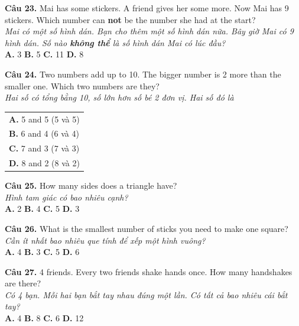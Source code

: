 \documentclass[11pt,a4paper]{article}
\begin{document}
\textbf{Câu 23.} Mai has some stickers. A friend gives her some more. Now Mai has 9 stickers. Which number can \textbf{not} be the number she had at the start?\\
\textit{Mai có một số hình dán. Bạn cho thêm một số hình dán nữa. Bây giờ Mai có 9 hình dán. Số nào \textbf{không thể} là số hình dán Mai có lúc đầu?}\\
\textbf{A.} 3 \quad \textbf{B.} 5 \quad \textbf{C.} 11 \quad \textbf{D.} 8\par\vspace{1.2mm}

\textbf{Câu 24.} Two numbers add up to 10. The bigger number is 2 more than the smaller one. Which two numbers are they?\\
\textit{Hai số có tổng bằng 10, số lớn hơn số bé 2 đơn vị. Hai số đó là}\\
\begin{tabular}{@{}l@{}}
\textbf{A.} 5 and 5 (5 và 5)\\
\textbf{B.} 6 and 4 (6 và 4)\\
\textbf{C.} 7 and 3 (7 và 3)\\
\textbf{D.} 8 and 2 (8 và 2)
\end{tabular}\par\vspace{1.2mm}

\textbf{Câu 25.} How many sides does a triangle have?\\
\textit{Hình tam giác có bao nhiêu cạnh?}\\
\textbf{A.} 2 \quad \textbf{B.} 4 \quad \textbf{C.} 5 \quad \textbf{D.} 3\par\vspace{1.2mm}

\textbf{Câu 26.} What is the smallest number of sticks you need to make one square?\\
\textit{Cần ít nhất bao nhiêu que tính để xếp một hình vuông?}\\
\textbf{A.} 4 \quad \textbf{B.} 3 \quad \textbf{C.} 5 \quad \textbf{D.} 6\par\vspace{1.2mm}

\textbf{Câu 27.} 4 friends. Every two friends shake hands once. How many handshakes are there?\\
\textit{Có 4 bạn. Mỗi hai bạn bắt tay nhau đúng một lần. Có tất cả bao nhiêu cái bắt tay?}\\
\textbf{A.} 4 \quad \textbf{B.} 8 \quad \textbf{C.} 6 \quad \textbf{D.} 12\par\vspace{1.2mm}
\end{document}
